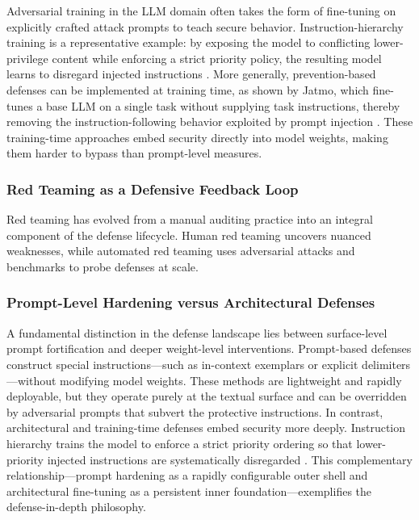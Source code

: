 \documentclass[11pt,a4paper]{article}
\begin{document}
Adversarial training in the LLM domain often takes the form of fine-tuning on explicitly crafted attack prompts to teach secure behavior. Instruction-hierarchy training is a representative example: by exposing the model to conflicting lower-privilege content while enforcing a strict priority policy, the resulting model learns to disregard injected instructions \cite{Wallace_2024_InstructionHierarchy}. More generally, prevention-based defenses can be implemented at training time, as shown by Jatmo, which fine-tunes a base LLM on a single task without supplying task instructions, thereby removing the instruction-following behavior exploited by prompt injection \cite{Piet_2023_Jatmo}. These training-time approaches embed security directly into model weights, making them harder to bypass than prompt-level measures.

\subsubsection{Red Teaming as a Defensive Feedback Loop}

Red teaming has evolved from a manual auditing practice into an integral component of the defense lifecycle. Human red teaming uncovers nuanced weaknesses, while automated red teaming uses adversarial attacks and benchmarks to probe defenses at scale.

\subsubsection{Prompt-Level Hardening versus Architectural Defenses}

A fundamental distinction in the defense landscape lies between surface-level prompt fortification and deeper weight-level interventions. Prompt-based defenses construct special instructions---such as in-context exemplars or explicit delimiters---without modifying model weights. These methods are lightweight and rapidly deployable, but they operate purely at the textual surface and can be overridden by adversarial prompts that subvert the protective instructions. In contrast, architectural and training-time defenses embed security more deeply. Instruction hierarchy trains the model to enforce a strict priority ordering so that lower-priority injected instructions are systematically disregarded \cite{Wallace_2024_InstructionHierarchy}. This complementary relationship---prompt hardening as a rapidly configurable outer shell and architectural fine-tuning as a persistent inner foundation---exemplifies the defense-in-depth philosophy.
\end{document}
